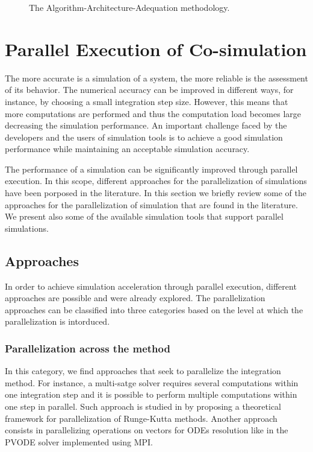 \begin{figure}[phbt]
\centering

\caption{The Algorithm-Architecture-Adequation methodology.}
\label{fig:aaa}
\end{figure} 

\section{Parallel Execution of Co-simulation}

The more accurate is a simulation of a system, the more reliable is the assessment of its behavior. The numerical accuracy can be improved in different ways, for instance, by choosing a small integration step size. However, this means that more computations are performed and thus the computation load becomes large decreasing the simulation performance. An important challenge faced by the developers and the users of simulation tools is to achieve a good simulation performance while maintaining an acceptable simulation accuracy. 

The performance of a simulation can be significantly improved through parallel execution. In this scope, different approaches for the parallelization of simulations have been porposed in the literature. In this section we briefly review some of the approaches for the parallelization of simulation that are found in the literature. We present also some of the available simulation tools that support parallel simulations.

\subsection{\label{subsec:parsimaprr}Approaches}

In order to achieve simulation acceleration through parallel execution, different approaches are possible and were already explored. The parallelization approaches can be classified into three categories based on the level at which the parallelization is intorduced.

\subsubsection{Parallelization across the method}
In this category, we find approaches that seek to parallelize the integration method. For instance, a multi-satge solver requires several computations within one integration step and it is possible to perform multiple computations within one step in parallel. Such approach is studied in \cite{iserles:1990} by proposing a theoretical framework for parallelization of Runge-Kutta methods. Another approach consists in parallelizing operations on vectors for ODEs resolution like in the PVODE solver \cite{byrne:1999} implemented using MPI. 

